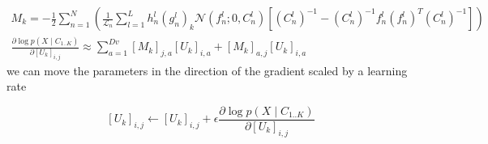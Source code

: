 \documentclass{paper}
\begin{document}
\begin{eqnarray}
M_k = -\frac{1}{2} \sum_{n=1}^N \left(\frac{1}{\mathcal{L}_n}  \sum_{l=1}^{L} h_n^l (g_n^l)_k \mathcal{N}(f_n^l;0,C_n^l)   \left[ (C_n^l)^{-1} - (C_n^l)^{-1} f_n^l (f_n^l)^T (C_n^l)^{-1} \right] \right) \\
\frac{\partial \log p(X \mid C_{1..K})}{\partial \left[ U_k \right]_{i,j}} \approx \sum_{a=1}^{Dv} \left[ M_k \right]_{j,a} \left[ U_k \right]_{i,a} + \left[ M_k \right]_{a,j} \left[ U_k \right]_{i,a}
\end{eqnarray}
%
we can move the parameters in the direction of the gradient scaled by a learning rate

\begin{equation}
\left[ U_k \right]_{i,j} \leftarrow \left[ U_k \right]_{i,j} + \epsilon \frac{\partial \log p(X \mid C_{1..K})}{\partial \left[ U_k \right]_{i,j}}
\end{equation}
\end{document}
